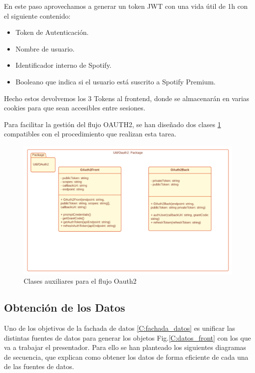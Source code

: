 En este paso aprovechamos a generar un token JWT con una vida útil de 1h con el siguiente contenido:

\begin{itemize}
    \item Token de Autenticación.
    \item Nombre de usuario.
    \item Identificador interno de Spotify.
    \item Booleano que indica si el usuario está suscrito a Spotify Premium.
\end{itemize}

Hecho estos devolvemos los 3 Tokens al frontend, donde se almacenarán en varias cookies para que sean accesibles entre sesiones. 

Para facilitar la gestión del flujo OAUTH2, se han diseñado dos clases \ref{fig:oauth_class} compatibles con el procedimiento que realizan esta tarea.

\begin{figure}
    \centering
    \includegraphics{img/C/oauth2_class_diag.png}
    \caption{Clases auxiliares para el flujo Oauth2}
    \label{fig:oauth_class}
\end{figure}

\subsection{Obtención de los Datos}\label{C:obtencion_datos_flow}

Uno de los objetivos de la fachada de datos \ref{C:fachada_datos} es unificar las distintas fuentes de datos para generar los objetos Fig.\ref{C:datos_front} con los que va a trabajar el presentador. Para ello se han planteado los siguientes diagramas de secuencia, que explican como obtener los datos de forma eficiente de cada una de las fuentes de datos. 

